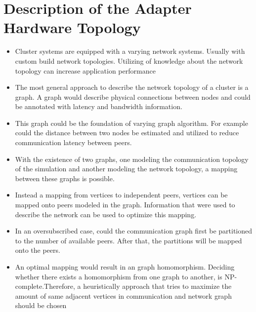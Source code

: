 \section*{Description of the Adapter Hardware Topology}
\begin{itemize}

\item Cluster systems are equipped with a varying network
  systems. Usually with custom build network topologies.  Utilizing of
  knowledge about the network topology can increase application
  performance

\item The most general approach to describe the network topology of a
  cluster is a graph. A graph would describe physical connections
  between nodes and could be annotated with latency and bandwidth
  information.

\item This graph could be the foundation of varying graph
  algorithm. For example could the distance between two nodes be
  estimated and utilized to reduce communication latency between
  peers.
  
\item With the existence of two graphs, one modeling the communication
  topology of the simulation and another modeling the network
  topology, a mapping between these graphs is possible.
  
\item Instead a mapping from vertices to independent peers, vertices
  can be mapped onto peers modeled in the graph. Information that were
  used to describe the network can be used to optimize this mapping.

\item In an oversubscribed case, could the communication graph first
  be partitioned to the number of available peers. After that, the
  partitions will be mapped onto the peers.

\item An optimal mapping would result in an graph
  homomorphism. Deciding whether there exists a homomorphism from one
  graph to another, is NP-complete.Therefore, a heuristically approach
  that tries to maximize the amount of same adjacent vertices in
  communication and network graph should be chosen
  

\end{itemize}
